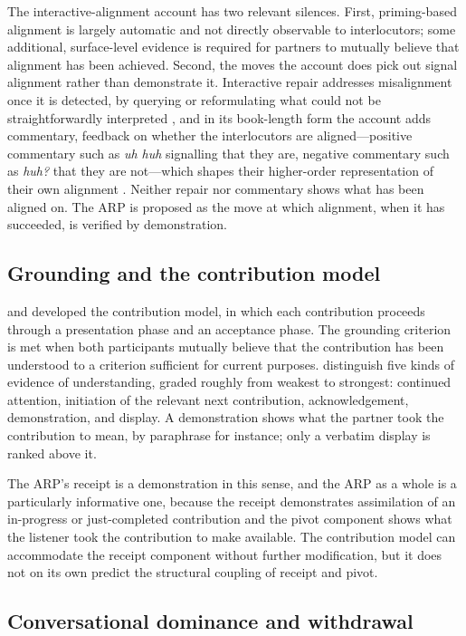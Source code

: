 The interactive-alignment account has two relevant silences. First, priming-based alignment is largely automatic and not directly observable to interlocutors; some additional, surface-level evidence is required for partners to mutually believe that alignment has been achieved. Second, the moves the account does pick out signal alignment rather than demonstrate it. Interactive repair addresses misalignment once it is detected, by querying or reformulating what could not be straightforwardly interpreted \citep{PickeringGarrod2004}, and in its book-length form the account adds commentary, feedback on whether the interlocutors are aligned---positive commentary such as \emph{uh huh} signalling that they are, negative commentary such as \emph{huh?} that they are not---which shapes their higher-order representation of their own alignment \citep{PickeringGarrod2021}. Neither repair nor commentary shows what has been aligned on. The ARP is proposed as the move at which alignment, when it has succeeded, is verified by demonstration.

\subsection{Grounding and the contribution model}

\citet{ClarkSchaefer1989} and \citet{ClarkBrennan1991} developed the contribution model, in which each contribution proceeds through a presentation phase and an acceptance phase. The grounding criterion is met when both participants mutually believe that the contribution has been understood to a criterion sufficient for current purposes. \citet{ClarkSchaefer1989} distinguish five kinds of evidence of understanding, graded roughly from weakest to strongest: continued attention, initiation of the relevant next contribution, acknowledgement, demonstration, and display. A demonstration shows what the partner took the contribution to mean, by paraphrase for instance; only a verbatim display is ranked above it.

The ARP's receipt is a demonstration in this sense, and the ARP as a whole is a particularly informative one, because the receipt demonstrates assimilation of an in-progress or just-completed contribution and the pivot component shows what the listener took the contribution to make available. The contribution model can accommodate the receipt component without further modification, but it does not on its own predict the structural coupling of receipt and pivot.

\subsection{Conversational dominance and withdrawal}

